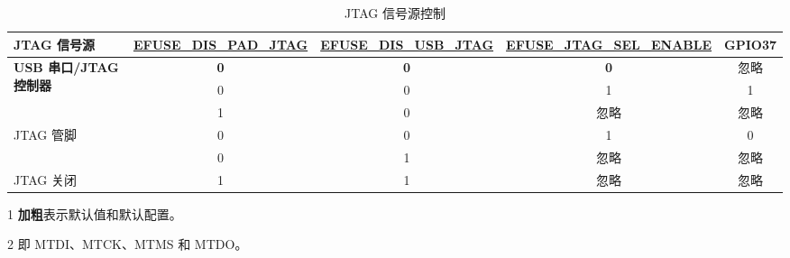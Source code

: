 \documentclass[main\_\_CN.tex]{subfiles}
\begin{document}
\begin{table}[H]
    \centering
    \caption{JTAG 信号源控制}
    \label{tab:jtag-signal-src-control}
    \begin{threeparttable}
    \begin{tabular}{ | l | c | c | c | c | }
    \hline
    
    \rowcolor{lightgray}
    \textbf{JTAG 信号源} & \textbf{\hyperref[fielddesc:EFUSEDISPADJTAG]{EFUSE\_DIS\_PAD\_JTAG}} & \textbf{\hyperref[fielddesc:EFUSEDISUSBJTAG]{EFUSE\_DIS\_USB\_JTAG}} & \textbf{\hyperref[fielddesc:EFUSEJTAGSELENABLE]{EFUSE\_JTAG\_SEL\_ENABLE}} &   \textbf{GPIO37}       \\\hline

    \multirow{3}{*}{\textbf{USB 串口/JTAG 控制器}} & \textbf{0} & \textbf{0} & \textbf{0} & 忽略 \\ \cline{2-5} 
     & 0 & 0 & 1 & 1 \\ \cline{2-5} 
     & 1 & 0 & 忽略 & 忽略 \\ \hline
    \multirow{2}{*}{JTAG 管脚 \tnote{2}} & 0 & 0 & 1 & 0 \\ \cline{2-5} 
     & 0 & 1 & 忽略 & 忽略 \\ \hline
    JTAG 关闭 & 1 & 1 & 忽略 & 忽略 \\ \hline
        \end{tabular}

        \begin{tablenotes}
            \item[1] \textbf{加粗}表示默认值和默认配置。
            \item[2] 即 MTDI、MTCK、MTMS 和 MTDO。
        \end{tablenotes}
    \end{threeparttable}
\end{table}
\end{document}
